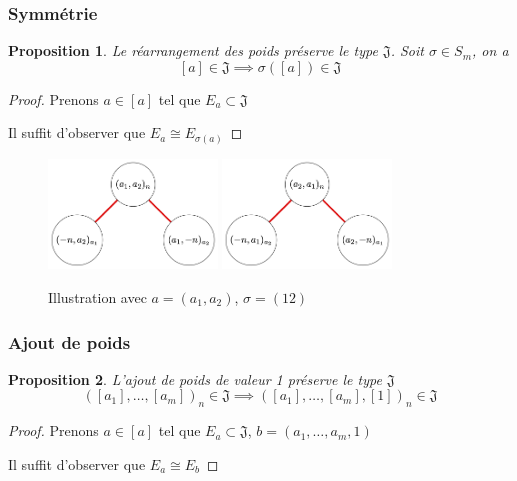 \documentclass{article}
\newtheorem{proposition}{Proposition}
\newcommand{\J}{\mathfrak{J}}
\begin{document}
\subsubsection{Symmétrie}

\begin{proposition}
    Le réarrangement des poids préserve le type $\J$. Soit $\sigma \in S_m$, on a
    \[ [a] \in \J \implies \sigma([a]) \in \J \]
\end{proposition}

\begin{proof}
    Prenons $a \in [a]$ tel que $E_a \subset \J$

    Il suffit d'observer que $E_a \cong E_{\sigma(a)}$
\end{proof}

\begin{figure}[h]
    \caption{Illustration avec $a = (a_1, a_2)$, $\sigma = (12)$}
    \centering
    \includegraphics[width=0.4\textwidth]{abn}
    \includegraphics[width=0.4\textwidth]{ban}
\end{figure}

\subsubsection{Ajout de poids}

\begin{proposition}
    L'ajout de poids de valeur 1 préserve le type $\J$
    \[ {([a_1], \dots, [a_m])}_n \in \J \implies {([a_1], \dots, [a_m], [1])}_n \in \J \]
\end{proposition}

\begin{proof}
    Prenons $a \in [a]$ tel que $E_a \subset \J$, $b = (a_1, \dots, a_m, 1)$

    Il suffit d'observer que $E_a \cong E_b$
\end{proof}
\end{document}
